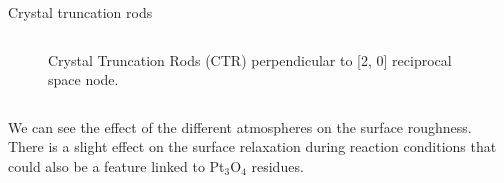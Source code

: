 \begin{frame}{Crystal truncation rods}
\begin{columns}
\begin{figure}

            \caption{Crystal Truncation Rods (CTR) perpendicular to [2, 0] reciprocal space node.}
            \label{fig:CTR_2_0}
        \end{figure}
    
    \end{columns}

    \pause
    We can see the effect of the different atmospheres on the surface roughness.\\
    \pause
    There is a slight effect on the surface relaxation during reaction conditions that could also be a feature linked to Pt$_3$O$_4$ residues.
\end{frame}